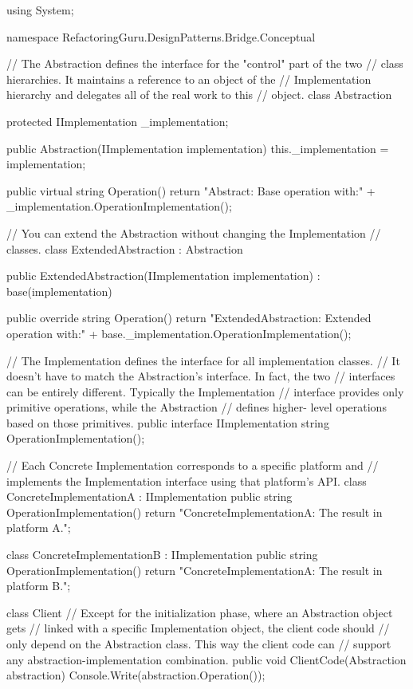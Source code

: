 using System;

namespace RefactoringGuru.DesignPatterns.Bridge.Conceptual
{
    // The Abstraction defines the interface for the "control" part of the two
    // class hierarchies. It maintains a reference to an object of the
    // Implementation hierarchy and delegates all of the real work to this
    // object.
    class Abstraction
    {
        protected IImplementation _implementation;
        
        public Abstraction(IImplementation implementation)
        {
            this._implementation = implementation;
        }
        
        public virtual string Operation()
        {
            return "Abstract: Base operation with:\n" + 
                _implementation.OperationImplementation();
        }
    }

    // You can extend the Abstraction without changing the Implementation
    // classes.
    class ExtendedAbstraction : Abstraction
    {
        public ExtendedAbstraction(IImplementation implementation) : base(implementation)
        {
        }
        
        public override string Operation()
        {
            return "ExtendedAbstraction: Extended operation with:\n" +
                base._implementation.OperationImplementation();
        }
    }

    // The Implementation defines the interface for all implementation classes.
    // It doesn't have to match the Abstraction's interface. In fact, the two
    // interfaces can be entirely different. Typically the Implementation
    // interface provides only primitive operations, while the Abstraction
    // defines higher- level operations based on those primitives.
    public interface IImplementation
    {
        string OperationImplementation();
    }

    // Each Concrete Implementation corresponds to a specific platform and
    // implements the Implementation interface using that platform's API.
    class ConcreteImplementationA : IImplementation
    {
        public string OperationImplementation()
        {
            return "ConcreteImplementationA: The result in platform A.\n";
        }
    }

    class ConcreteImplementationB : IImplementation
    {
        public string OperationImplementation()
        {
            return "ConcreteImplementationA: The result in platform B.\n";
        }
    }

    class Client
    {
        // Except for the initialization phase, where an Abstraction object gets
        // linked with a specific Implementation object, the client code should
        // only depend on the Abstraction class. This way the client code can
        // support any abstraction-implementation combination.
        public void ClientCode(Abstraction abstraction)
        {
            Console.Write(abstraction.Operation());
        }
    }
    
}
